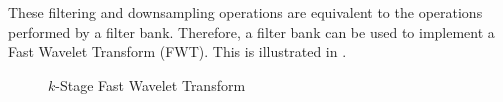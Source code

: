 These filtering and downsampling operations are equivalent to the 
operations performed by a filter bank.  
Therefore, a filter bank can be 
used to implement a Fast Wavelet Transform (FWT).
This is illustrated in .

\begin{figure}[h] %
\centering\gsize
\caption{
   $k$-Stage Fast Wavelet Transform
   \label{fig:fwt}
   }
\end{figure}





